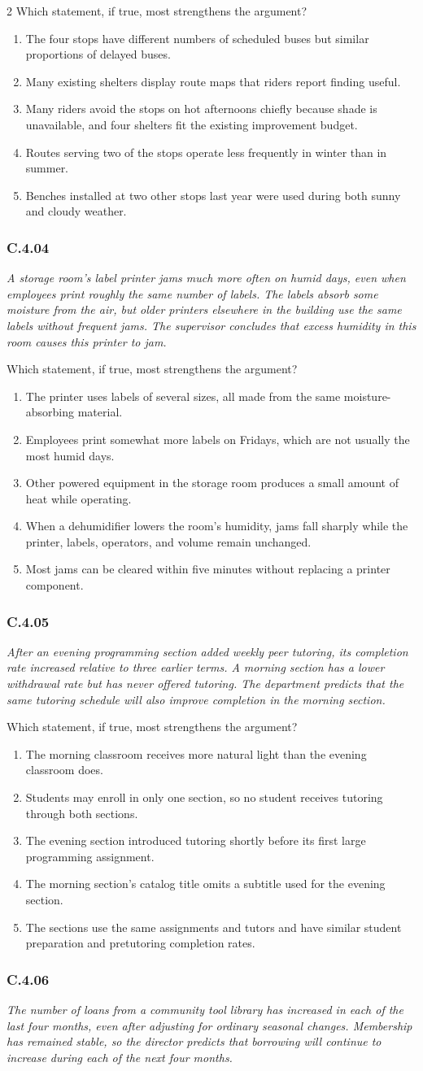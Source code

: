 \documentclass[10pt]{extarticle}
\newcommand{\choice}[1]{\item #1}
\newcommand{\bankitem}[1]{\subsubsection*{#1}}
\begin{document}
\begin{multicols}{2}
Which statement, if true, most strengthens the argument?
\begin{enumerate}[label=(\alph*)]
  \choice{The four stops have different numbers of scheduled buses but similar proportions of delayed buses.}
  \choice{Many existing shelters display route maps that riders report finding useful.}
  \choice{Many riders avoid the stops on hot afternoons chiefly because shade is unavailable, and four shelters fit the existing improvement budget.}
  \choice{Routes serving two of the stops operate less frequently in winter than in summer.}
  \choice{Benches installed at two other stops last year were used during both sunny and cloudy weather.}
\end{enumerate}
\bankitem{C.4.04}
\emph{A storage room's label printer jams much more often on humid days, even when employees print roughly the same number of labels. The labels absorb some moisture from the air, but older printers elsewhere in the building use the same labels without frequent jams. The supervisor concludes that excess humidity in this room causes this printer to jam.}

Which statement, if true, most strengthens the argument?
\begin{enumerate}[label=(\alph*)]
  \choice{The printer uses labels of several sizes, all made from the same moisture-absorbing material.}
  \choice{Employees print somewhat more labels on Fridays, which are not usually the most humid days.}
  \choice{Other powered equipment in the storage room produces a small amount of heat while operating.}
  \choice{When a dehumidifier lowers the room's humidity, jams fall sharply while the printer, labels, operators, and volume remain unchanged.}
  \choice{Most jams can be cleared within five minutes without replacing a printer component.}
\end{enumerate}
\bankitem{C.4.05}
\emph{After an evening programming section added weekly peer tutoring, its completion rate increased relative to three earlier terms. A morning section has a lower withdrawal rate but has never offered tutoring. The department predicts that the same tutoring schedule will also improve completion in the morning section.}

Which statement, if true, most strengthens the argument?
\begin{enumerate}[label=(\alph*)]
  \choice{The morning classroom receives more natural light than the evening classroom does.}
  \choice{Students may enroll in only one section, so no student receives tutoring through both sections.}
  \choice{The evening section introduced tutoring shortly before its first large programming assignment.}
  \choice{The morning section's catalog title omits a subtitle used for the evening section.}
  \choice{The sections use the same assignments and tutors and have similar student preparation and pretutoring completion rates.}
\end{enumerate}
\bankitem{C.4.06}
\emph{The number of loans from a community tool library has increased in each of the last four months, even after adjusting for ordinary seasonal changes. Membership has remained stable, so the director predicts that borrowing will continue to increase during each of the next four months.}


\end{multicols}
\end{document}
